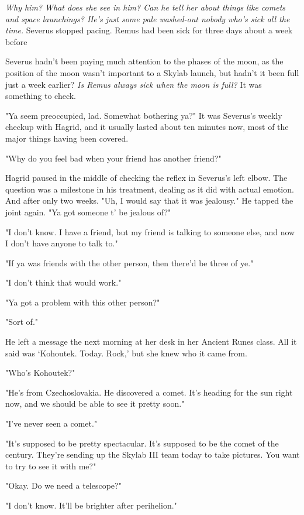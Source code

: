 \emph{Why him? What does she see in him? Can he tell her about things like comets and space launchings? He's just some pale washed-out nobody who's sick all the time.} Severus stopped pacing. Remus had been sick for three days about a week before{\el}

Severus hadn't been paying much attention to the phases of the moon, as the position of the moon wasn't important to a Skylab launch, but hadn't it been full just a week earlier? \emph{Is Remus always sick when the moon is full?} It was something to check.

"Ya seem preoccupied, lad. Somewhat bothering ya?" It was Severus's weekly checkup with Hagrid, and it usually lasted about ten minutes now, most of the major things having been covered.

"Why do you feel bad when your friend has another friend?"

Hagrid paused in the middle of checking the reflex in Severus's left elbow. The question was a milestone in his treatment, dealing as it did with actual emotion. And after only two weeks. "Uh, I would say that it was jealousy." He tapped the joint again. "Ya got someone t' be jealous of?"

"I don't know. I have a friend, but{\el} my friend is talking to someone else, and now I don't have anyone to talk to."

"If ya was friends with the other person, then there'd be three of ye."

"I don't think that would work."

"Ya got a problem with this other person?"

"Sort of."

He left a message the next morning at her desk in her Ancient Runes class. All it said was `Kohoutek. Today. Rock,' but she knew who it came from.

"Who's Kohoutek?"

"He's from Czechoslovakia. He discovered a comet. It's heading for the sun right now, and we should be able to see it pretty soon."

"I've never seen a comet."

"It's supposed to be pretty spectacular. It's supposed to be the comet of the century. They're sending up the Skylab III team today to take pictures. You want to try to see it with me?"

"Okay. Do we need a telescope?"

"I don't know. It'll be brighter after perihelion."

